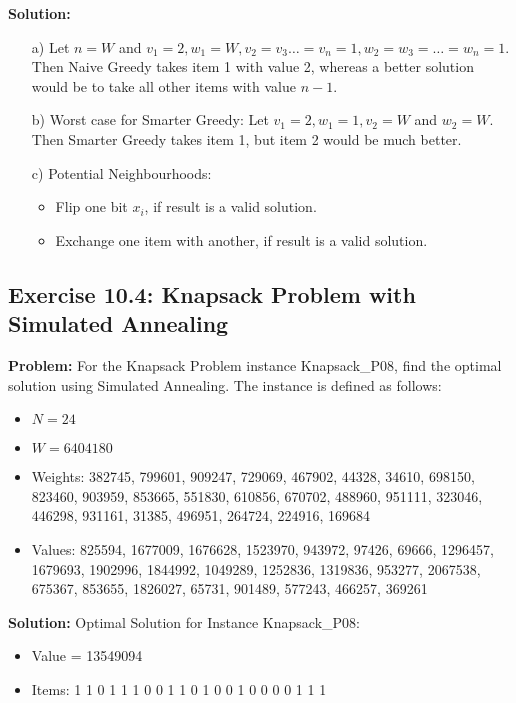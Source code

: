 \textbf{Solution:}
\begin{enumerate}
\item[a)] Let \(n = W\) and \(v_1 = 2, w_1 = W, v_2 = v_3 \ldots = v_n = 1, w_2 = w_3 = \ldots = w_n = 1\). Then Naive Greedy takes item 1 with value 2, whereas a better solution would be to take all other items with value \(n-1\).
\item[b)] Worst case for Smarter Greedy: Let \(v_1 = 2, w_1 = 1, v_2 = W\) and \(w_2 = W\). Then Smarter Greedy takes item 1, but item 2 would be much better.
\item[c)] Potential Neighbourhoods:
  \begin{itemize}
  \item Flip one bit \(x_i\), if result is a valid solution.
  \item Exchange one item with another, if result is a valid solution.
  \end{itemize}
\end{enumerate}

\subsection{Exercise 10.4: Knapsack Problem with Simulated Annealing}
\textbf{Problem:}
For the Knapsack Problem instance Knapsack\_P08, find the optimal solution using Simulated Annealing. The instance is defined as follows:

\begin{itemize}
\item \(N = 24\)
\item \(W = 6404180\)
\item Weights: 382745, 799601, 909247, 729069, 467902, 44328, 34610, 698150, 823460, 903959, 853665, 551830, 610856, 670702, 488960, 951111, 323046, 446298, 931161, 31385, 496951, 264724, 224916, 169684
\item Values: 825594, 1677009, 1676628, 1523970, 943972, 97426, 69666, 1296457, 1679693, 1902996, 1844992, 1049289, 1252836, 1319836, 953277, 2067538, 675367, 853655, 1826027, 65731, 901489, 577243, 466257, 369261
\end{itemize}

\textbf{Solution:}
Optimal Solution for Instance Knapsack\_P08:
\begin{itemize}
\item Value = 13549094
\item Items: 1 1 0 1 1 1 0 0 1 1 0 1 0 0 1 0 0 0 0 1 1 1
\end{itemize}


